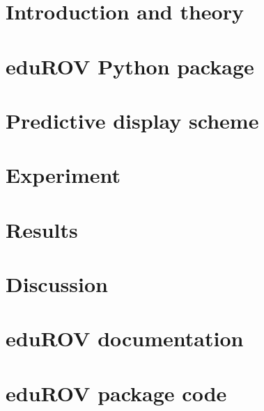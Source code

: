 \documentclass[b5paper,10pt,twoside,openright]{book}
\begin{document}
{
\chapter{Introduction and theory} \label{chpIntroduction}
		
	
\chapter{eduROV Python package}\label{chpEdurov}
		
	
\chapter{Predictive display scheme}\label{chpPredictive}
		
	
\chapter{Experiment}\label{chpMethod}
		

\chapter{Results}\label{chpResults}
	

\chapter{Discussion}\label{chpDiscussion}
	

{
}
\printbibliography
{}

\begin{appendices}\label{appendix}

\chapter*{eduROV documentation}\label{appDoc}


\chapter*{eduROV package code}\label{appCode}



\end{appendices}}
\end{document}
